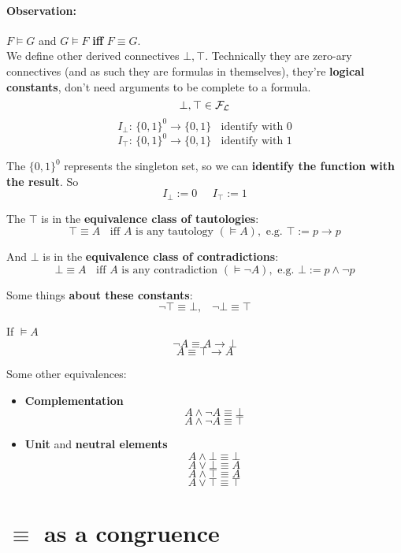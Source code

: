 	\paragraph{Observation:} $F \models G$ and $G \models F$ \textbf{iff} $F \equiv G$.\\

	We define other derived connectives $\bot, \top$. Technically they are zero-ary connectives (and as such they are formulas in themselves), they're \textbf{logical constants}, don't need arguments to be complete to a formula.\\
	$$ \bot, \top \in \mathcal{F}_\mathcal{L} $$
	$$ I_\bot: \, \{0,1\}^0 \rightarrow \{0,1\}\;\; \text{ identify with } 0$$
	$$I_\top: \, \{0,1\}^0 \rightarrow \{0,1\} \;\; \text{ identify with } 1$$

	The $\{0,1\}^0$ represents the singleton set, so we can \textbf{identify the function with the result}. So
	$$ I_\bot := 0 \;\;\;\;\; I_\top := 1$$

	The $\top$ is in the \textbf{equivalence class of tautologies}:
	$$ \top \equiv A \;\; \text{ iff } A \text{ is any tautology } (\models A), \text{ e.g. } \top := p \rightarrow p$$

	And $\bot$ is in the \textbf{equivalence class of contradictions}:
	$$ \bot \equiv A \;\; \text{ iff } A \text{ is any contradiction } (\models \neg A), \text{ e.g. } \bot := p \wedge \neg p$$

	\newpage

	Some things \textbf{about these constants}:
	$$ \neg \top \equiv \bot, \;\;\; \neg \bot \equiv \top $$

	If $\models A$
	$$ \neg A \equiv A \rightarrow \bot $$
	$$ A \equiv \top \rightarrow A $$

	Some other equivalences:
	\begin{itemize}
		\item \textbf{Complementation}
		$$ A \wedge \neg A \equiv \bot $$
		$$ A \wedge \neg A \equiv \top $$

		\item \textbf{Unit} and \textbf{neutral elements}
		$$ A \wedge \bot \equiv \bot $$
		$$ A \vee \bot \equiv A $$
		$$ A \wedge \top \equiv A $$
		$$ A \vee \top \equiv \top $$
	\end{itemize}

	\newpage

	\section{$\equiv$ as a congruence}

